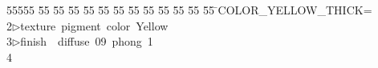 %
%
\begin{tabbing}
55555 \= 55 \= 55 \= 55 \= 55 \= 55 \= 55 \= 55 \= 55 \= 55 \= 55 \= 55 \= 55 \= \>COLOR\_YELLOW\_THICK=\\[0pt]
2\>$\triangleright$\>texture\ pigment\ color\ Yellow\ \ \\[0pt]
3\>$\triangleright$\>finish\ \ diffuse\ 09\ phong\ 1\\[0pt]
4\>\end{tabbing}
